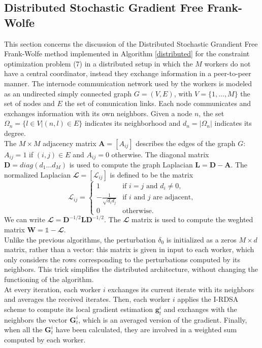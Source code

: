 \subsection{Distributed Stochastic Gradient Free Frank-Wolfe}
This section concerns the discussion of the Distributed Stochastic Grandient Free Frank-Wolfe method implemented in Algorithm \ref{distributed} for the constraint optimization problem (7) in a distributed setup in which the $M$ workers do not have a central coordinator, instead they exchange information in a peer-to-peer manner. The internode communication network used by the workers is modeled as an undirected simply connected graph $G=(V,E)$, with $V=\{1, \dots, M\}$ the set of nodes and $E$ the set of comunication links. Each node communicates and exchanges information with its own neighbors. Given a node $n$, the set $\Omega_n = \{l \in V | (n,l)\in E\}$ indicates its neighborhood and $d_n = |\Omega_n|$ indicates its degree.\\ \indent The $M \times M$ adjacency matrix $\mathbf{A}=[A_{ij}]$ describes the edges of the graph $G$: $A_{ij}=1$ if $(i,j) \in E$ and $A_{ij}=0$ otherwise. The diagonal matrix $\mathbf{D}=diag(d_1 \dots d_M)$ is used to compute the graph Laplacian $\mathbf{L}=\mathbf{D}-\mathbf{A}$. The normalized Laplacian $\mathbfcal{L} = [\mathcal{L}_{ij}]$ is defined to be the matrix
\[
\mathcal{L}_{ij}=
\begin{cases}
	1 & \text{if $i=j$ and }d_i\ne0, \\
	-\frac{1}{\sqrt{d_id_j}} & \text{if $i$ and $j$ are adjacent,}\\
	0 & \text{otherwise.}
	
\end{cases}
\]
We can write $\mathbfcal{L} = \mathbf{D}^{-1/2}\mathbf{L}\mathbf{D}^{-1/2}$. The $\mathbfcal{L}$ matrix is used to compute the weghted matrix $\mathbf{W} = \mathbb{1}- \mathbfcal{L}$.\\
\indent Unlike the previous algorithms, the perturbation \mbox{\boldmath$ \delta$}$_0$ is initialized as a zeros $M \times d$ matrix, rather than a vector: this matrix is given in input to each worker, which only considers the rows corresponding to the perturbations computed by its neighbors. This trick simplifies the distributed architecture, without changing the functioning of the algorithm.\\
\indent At every iteration, each worker $i$ exchanges its current iterate with its neighbors and averages the received iterates. Then, each worker $i$ applies the I-RDSA scheme to compute its local gradient estimation $\mathbf{g}_t^i$ and exchanges with the neighbors the vector $\mathbf{G}_t^i$, which is an averaged version of the gradient. Finally, when all the $\mathbf{G}_t^i$ have been calculated, they are involved in a weighted sum computed by each worker.\\
